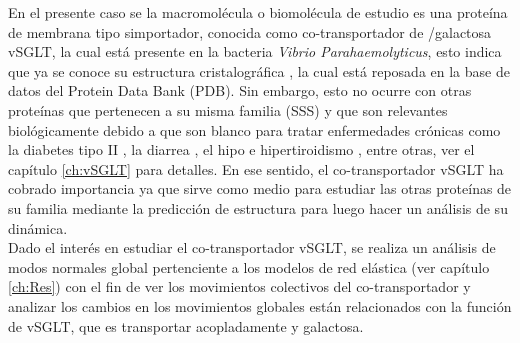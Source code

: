 En el presente caso se la macromol\'{e}cula o biomol\'{e}cula de estudio es una prote\'{i}na de membrana tipo simportador, conocida como co-transportador de /galactosa vSGLT, la cual est\'{a} presente en la bacteria \textit{Vibrio Parahaemolyticus}, esto indica que ya se conoce su estructura cristalogr\'{a}fica \cite{Faham2008}, la cual est\'{a} reposada en la base de datos del Protein Data Bank (PDB). Sin embargo, esto no ocurre con otras prote\'{i}nas que pertenecen a su misma familia (SSS) y que son relevantes biol\'{o}gicamente debido a que son blanco  para tratar enfermedades cr\'{o}nicas como la diabetes tipo II \cite{Bisha2014}, la diarrea \cite{Hamilton2013}, el hipo e hipertiroidismo \cite{Ferrandino2016}, entre otras, ver el cap\'{i}tulo  \ref{ch:vSGLT} para detalles. En ese sentido, el co-transportador vSGLT ha cobrado importancia ya que sirve como medio para estudiar las otras prote\'{i}nas de su familia mediante la predicci\'{o}n de estructura para luego hacer un an\'{a}lisis de su din\'{a}mica.\\

Dado el inter\'{e}s en estudiar el co-transportador vSGLT, se realiza un an\'{a}lisis de modos normales global pertenciente a los modelos de red el\'{a}stica (ver cap\'{i}tulo \ref{ch:Res}) con el fin de ver los movimientos colectivos del co-transportador y analizar los cambios en los movimientos globales est\'{a}n relacionados con la funci\'{o}n de vSGLT, que es transportar acopladamente  y galactosa.
